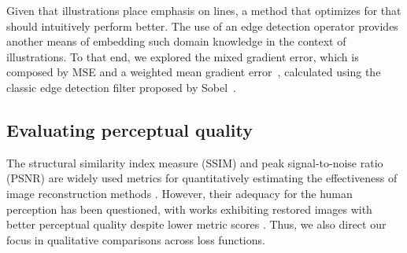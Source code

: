 Given that illustrations place emphasis on lines, a method that optimizes for that should intuitively perform better. The use of an edge detection operator provides another means of embedding such domain knowledge in the context of illustrations. To that end, we explored the mixed gradient error, which is composed by MSE and a weighted mean gradient error~\cite{lu2019single}, calculated using the classic edge detection filter proposed by Sobel~\cite{kanopoulos1988design}.
~\cite{galindo2019image}

\subsection{Evaluating perceptual quality}

The structural similarity index measure (SSIM) and peak signal-to-noise ratio (PSNR) are widely used metrics for quantitatively estimating the effectiveness of image reconstruction methods \cite{dong2015image,shi2016realtime,zhao2016loss,lu2019single}. However, their adequacy for the human perception has been questioned, with works exhibiting restored images with better perceptual quality despite lower metric scores \cite{johnson2016perceptual,ledig2017photorealistic}. Thus, we also direct our focus in qualitative comparisons across loss functions.